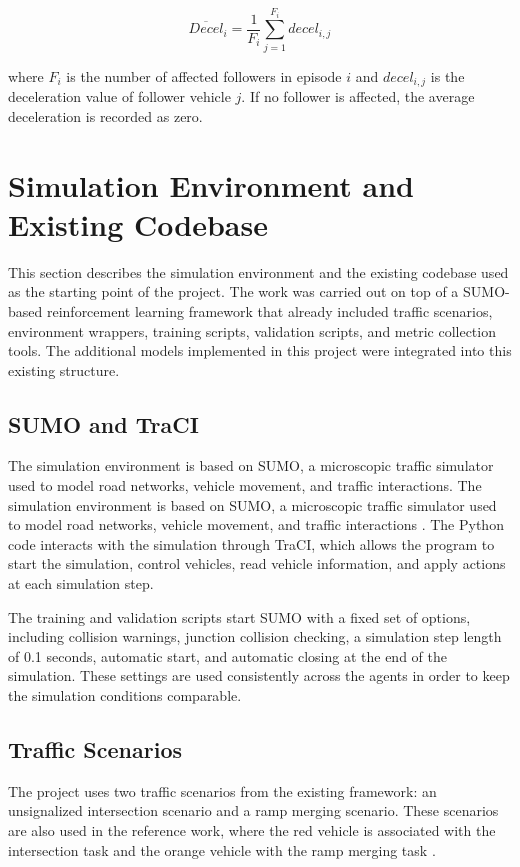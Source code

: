\documentclass{article}
\begin{document}
\[
\overline{Decel}_i = \frac{1}{F_i}\sum_{j=1}^{F_i} decel_{i,j}
\]

where $F_i$ is the number of affected followers in episode $i$ and $decel_{i,j}$ is the deceleration value of follower vehicle $j$. If no follower is affected, the average deceleration is recorded as zero.


\section{Simulation Environment and Existing Codebase}

This section describes the simulation environment and the existing codebase used as the starting point of the project. The work was carried out on top of a SUMO-based reinforcement learning framework that already included traffic scenarios, environment wrappers, training scripts, validation scripts, and metric collection tools. The additional models implemented in this project were integrated into this existing structure.

\subsection{SUMO and TraCI}

The simulation environment is based on SUMO, a microscopic traffic simulator used to model road networks, vehicle movement, and traffic interactions. The simulation environment is based on SUMO, a microscopic traffic simulator used to model road networks, vehicle movement, and traffic interactions \cite{lopez2018microscopic}. The Python code interacts with the simulation through TraCI, which allows the program to start the simulation, control vehicles, read vehicle information, and apply actions at each simulation step.

The training and validation scripts start SUMO with a fixed set of options, including collision warnings, junction collision checking, a simulation step length of 0.1 seconds, automatic start, and automatic closing at the end of the simulation. These settings are used consistently across the agents in order to keep the simulation conditions comparable.


\subsection{Traffic Scenarios}

The project uses two traffic scenarios from the existing framework: an unsignalized intersection scenario and a ramp merging scenario. These scenarios are also used in the reference work, where the red vehicle is associated with the intersection task and the orange vehicle with the ramp merging task \cite{maad2025dynamic}.
\end{document}
